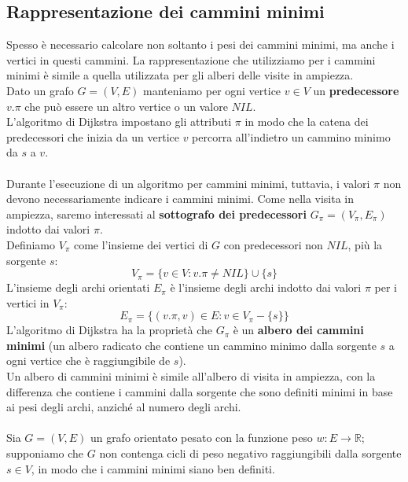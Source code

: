 \subsection{Rappresentazione dei cammini minimi}
Spesso è necessario calcolare non soltanto i pesi dei cammini minimi, ma anche i vertici in questi cammini. La rappresentazione che utilizziamo per i cammini minimi è simile a quella utilizzata per gli alberi delle visite in ampiezza.\\
Dato un grafo $G = (V, E)$ manteniamo per ogni vertice $v \in V$ un \textbf{predecessore} $v.\pi$ che può essere un altro vertice o un valore $NIL$.\\
L'algoritmo di Dijkstra impostano gli attributi $\pi$ in modo che la catena dei predecessori che inizia da un vertice $v$ percorra all'indietro un cammino minimo da $s$ a $v$.\\\\
Durante l'esecuzione di un algoritmo per cammini minimi, tuttavia, i valori $\pi$ non devono necessariamente indicare i cammini minimi. Come nella visita in ampiezza, saremo interessati al \textbf{sottografo dei predecessori} $G_{\pi} = (V_{\pi}, E_{\pi})$ indotto dai valori $\pi$.\\
Definiamo $V_{\pi}$ come l'insieme dei vertici di $G$ con predecessori non $NIL$, più la sorgente $s$:
    \begin{equation}
        V_{\pi} = \{   v \in V: v.\pi \neq NIL  \} \cup \{s\}
    \end{equation}
L'insieme degli archi orientati $E_{\pi}$ è l'insieme degli archi indotto dai valori $\pi$ per i vertici in $V_{\pi}$:
    \begin{equation}
        E_{\pi} = \{   (v.\pi, v) \in E: v \in V_{\pi} - \{s\}  \} 
    \end{equation}
L'algoritmo di Dijkstra ha la proprietà che $G_{\pi}$ è un \textbf{albero dei cammini minimi} (un albero radicato che contiene un cammino minimo dalla sorgente $s$ a ogni vertice che è raggiungibile de $s$).\\
Un albero di cammini minimi è simile all'albero di visita in ampiezza, con la differenza che contiene i cammini dalla sorgente che sono definiti minimi in base ai pesi degli archi, anziché al numero degli archi.\\\\
Sia $G = (V, E)$ un grafo orientato pesato con la funzione peso $w: E \rightarrow \mathbb{R}$; supponiamo che $G$ non contenga cicli di peso negativo raggiungibili dalla sorgente $s \in V$, in modo che i cammini minimi siano ben definiti.\\
